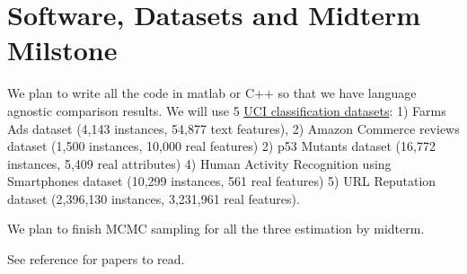 \documentclass[a4paper, 10pt]{article}
\begin{document}
\section {Software, Datasets and Midterm Milstone}
\vspace{-5pt}

We plan to write all the code in matlab or C++ so that we have language
agnostic comparison results. We will use 5
\href{http://archive.ics.uci.edu/ml/datasets.html}{UCI classification
datasets}: 1) Farms Ads dataset (4,143 instances, 54,877 text features), 2)
Amazon Commerce reviews dataset (1,500 instances, 10,000 real features) 2) p53
Mutants dataset (16,772 instances, 5,409 real attributes) 4) Human Activity
Recognition using Smartphones dataset (10,299 instances, 561 real features) 5)
URL Reputation dataset (2,396,130 instances, 3,231,961 real features).

We plan to finish MCMC sampling for all the three estimation by midterm.

See reference for papers to read.


\end{document}
